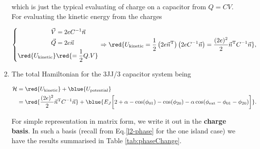 \begin{enumerate}
  \noindent which is just the typical evaluating of charge on a capacitor from $ Q = CV $. For
  evaluating the kinetic energy from the charges
  
  \begin{equation}
    \left\lbrace \begin{aligned}
        \vec{V} & = 2eC^{-1}\vec{n}\\
        \vec{Q} & = 2e\vec{n}\\
        \red{U_{\text{kinetic}}} & \red{= \frac{1}{2}Q.V}\\
      \end{aligned}\right.  \Rightarrow \red{U_{\text{kinetic}} =
      \frac{1}{2}\left(2e\vec{n}^{\text{T}}\right)\left(2eC^{-1}\vec{n}\right)               =
      \frac{(2e)^2}{2}\vec{n}^{\text{T}}C^{-1}\vec{n}},
  \end{equation}
  
  
\item The total Hamiltonian for the 3JJ/3 capacitor system being
  
  \begin{equation}
    \label{eqn:l23JJ}
    \begin{aligned}
      \mathcal{H}   &  =   \red{U_{\text{kinetic}}}   +   \blue{U_{\text{potential}}}\\  &   =
      \red{\frac{(2e)^2}{2}\vec{n}^{\text{T}}C^{-1}\vec{n}}     +     \blue{E_J\bigg[2+\alpha     -
        \cos(\phi_{01}) - \cos(\phi_{20}) - \alpha\cos(\phi_\text{ext}-\phi_{01} - \phi_{20})\bigg]}.
    \end{aligned}
  \end{equation}
  
  For simple representation in  matrix form, we write it out in  the \textbf{charge basis}. In
  such a basis (recall  from Eq.\eqref{l2-phase} for the one island case)  we have the results
  summarised in Table \ref{tab:phaseChange}.
  

\end{enumerate}
